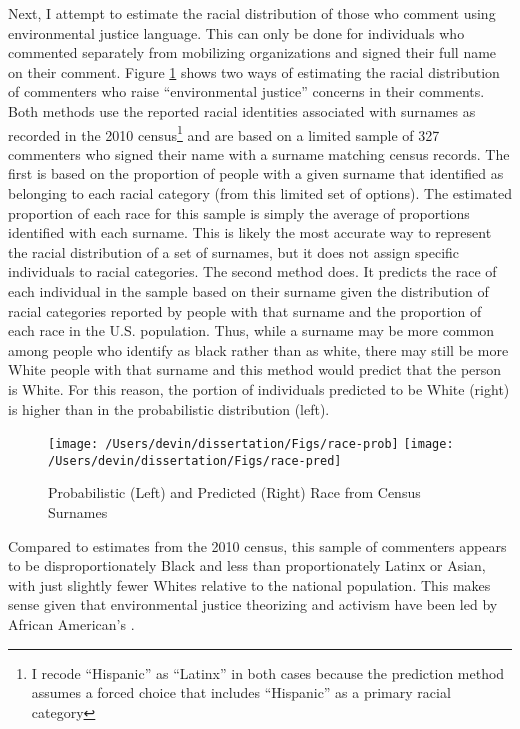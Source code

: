 \documentclass[
      12pt,
        ]{article}
\begin{document}
Next, I attempt to estimate the racial distribution of those who comment
using environmental justice language. This can only be done for
individuals who commented separately from mobilizing organizations and
signed their full name on their comment. Figure
\ref{fig:ejcommentsbyrace} shows two ways of estimating the racial
distribution of commenters who raise ``environmental justice'' concerns in
their comments. Both methods use the reported racial identities
associated with surnames as recorded in the 2010 census\footnote{I recode ``Hispanic'' as ``Latinx'' in both cases because the
  prediction method assumes a forced choice that includes ``Hispanic''
  as a primary racial category}
and are
based on a limited sample of 327 commenters who signed their name with a
surname matching census records. The first is based on the proportion of
people with a given surname that identified as belonging to each racial
category (from this limited set of options). The estimated proportion of
each race for this sample is simply the average of proportions
identified with each surname. This is likely the most accurate way to
represent the racial distribution of a set of surnames, but it does not
assign specific individuals to racial categories. The second method
does. It predicts the race of each individual in the sample based on
their surname given the distribution of racial categories reported by
people with that surname and the proportion of each race in the U.S.
population. Thus, while a surname may be more common among people who
identify as black rather than as white, there may still be more White
people with that surname and this method would predict that the person
is White. For this reason, the portion of individuals predicted to be
White (right) is higher than in the probabilistic distribution (left).

\begin{figure}

{\centering \texttt{[image: /Users/devin/dissertation/Figs/race-prob]} \texttt{[image: /Users/devin/dissertation/Figs/race-pred]} 

}

\caption{Probabilistic (Left) and Predicted (Right) Race from Census Surnames}\label{fig:ejcommentsbyrace}
\end{figure}

Compared to estimates from the 2010 census, this sample of commenters
appears to be disproportionately Black and less than proportionately
Latinx or Asian, with just slightly fewer Whites relative to the
national population. This makes sense given that environmental justice
theorizing and activism have been led by African American's
\citep{Bullard1993}.
\end{document}
